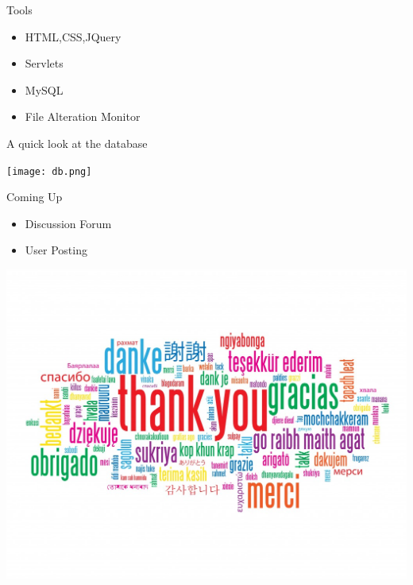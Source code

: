 \documentclass[14pt]{beamer}
\begin{document}
\begin{frame}{Tools}
	\begin{itemize}
		\item HTML,CSS,JQuery
		\item Servlets
		\item MySQL
		\item File Alteration Monitor
	\end{itemize}
\end{frame}


\begin{frame}{A quick look at the database}
	\begin{center}
		\texttt{[image: db.png]}
	\end{center}
\end{frame}

\begin{frame}{Coming Up}
	\begin{itemize}
		\item Discussion Forum
		\item User Posting
	\end{itemize}
\end{frame}

\begin{frame}
	\begin{center}
		\includegraphics[scale=0.3]{ty.jpg}
	\end{center}
\end{frame}
\end{document}
